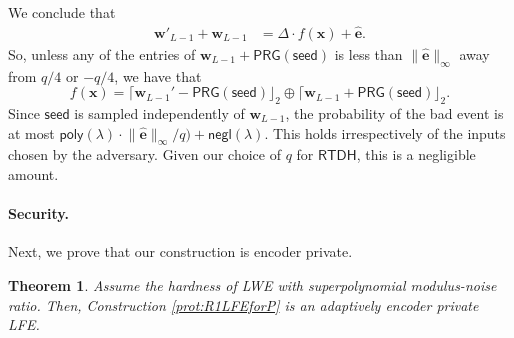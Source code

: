 \documentclass{article}
\newtheorem{theorem}{Theorem}\newtheorem{lemma}[theorem]{Lemma}\newtheorem{proposition}[theorem]{Proposition}\newtheorem{corollary}[theorem]{Corollary}\newtheorem{definition}[theorem]{Definition}\newtheorem{claim}[theorem]{Claim}
\newcommand{\poly}{\mathsf{poly}}
\newcommand{\negl}{\mathsf{negl}}
\renewcommand{\sec}{\ensuremath{\lambda}}
\newcommand{\RTDH}{\mathsf{RTDH}}
\begin{document}
We conclude that
\begin{align}
\mathbf{w}'_{L-1}+\mathbf{w}_{L-1}
&=\Delta\cdot f(\mathbf{x})+\widehat{\mathbf e}.\label{eq45}
\end{align}
So, unless any of the entries of $\mathbf{w}_{L-1}+\mathsf{PRG}(\mathsf{seed})$ is less than $\lVert\widehat{\mathbf e}\rVert_\infty$ away from $q/4$ or $-q/4$, we have that \[f(\mathbf{x})=\lceil\mathbf{w}_{L-1}'-\mathsf{PRG}(\mathsf{seed})\rfloor_2\oplus \lceil\mathbf{w}_{L-1}+\mathsf{PRG}(\mathsf{seed})\rfloor_2.\] 
Since $\mathsf{seed}$ is sampled independently of $\mathbf{w}_{L-1}$, the probability of the bad event is at most $\poly(\sec)\cdot \lVert\widehat{\mathbf e}\rVert_\infty/q)+\negl(\sec)$. {This holds irrespectively of the inputs chosen by the adversary.} Given our choice of $q$ for $\RTDH$, this is a negligible amount. 

\paragraph{Security.} Next, we prove that our construction is encoder private.

\begin{theorem}
Assume the hardness of LWE with superpolynomial modulus-noise ratio. Then, Construction \ref{prot:R1LFEforP} is an adaptively encoder private LFE. 
\end{theorem}
\end{document}
